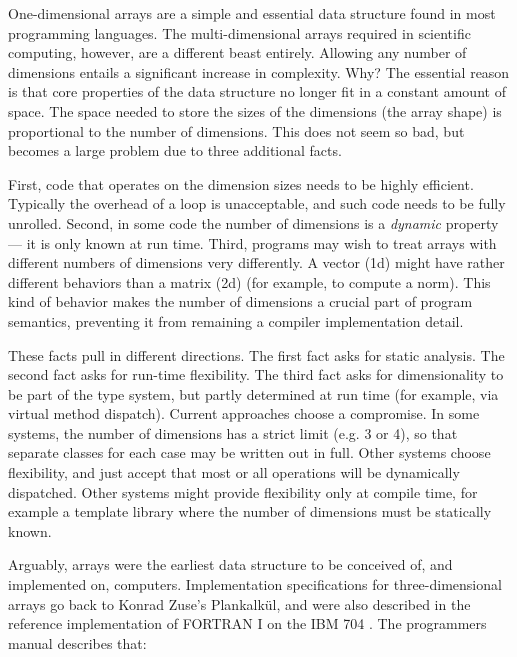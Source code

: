 \documentclass[preprint]{sigplanconf}
\begin{document}
One-dimensional arrays are a simple and essential data structure found in
most programming languages. The multi-dimensional arrays required in
scientific computing, however, are a different beast entirely. Allowing
any number of dimensions entails a significant increase in complexity. Why?
The essential reason is that core properties of the data structure no
longer fit in a constant amount of space. The space needed to store the
sizes of the dimensions (the array shape) is proportional to the number
of dimensions. This does not seem so bad, but becomes a large problem
due to three additional facts.

First, code that operates on the dimension
sizes needs to be highly efficient. Typically the overhead of a loop is
unacceptable, and such code needs to be fully unrolled. Second, in some
code the number of dimensions is a \emph{dynamic} property --- it is
only known at run time. Third, programs may wish to treat arrays with
different numbers of dimensions very differently. A vector (1d) might
have rather different behaviors than a matrix (2d) (for example, to
compute a norm). This kind of
behavior makes the number of dimensions a crucial part of program
semantics, preventing it from remaining a compiler implementation detail.


These facts pull in different directions. The first fact asks for static
analysis. The second fact asks for run-time flexibility. The third fact asks
for dimensionality to be part of the type system, but partly determined
at run time (for example, via virtual method dispatch). Current approaches
choose a compromise. In some systems, the number of dimensions has a strict
limit (e.g. 3 or 4), so that separate classes for each case may be written
out in full. Other systems choose flexibility, and just accept that most
or all operations will be dynamically dispatched. Other systems might
provide flexibility only at compile time, for example a template library
where the number of dimensions must be statically known.

Arguably, arrays were the earliest data structure to be conceived of, and implemented on, computers. Implementation specifications for three-dimensional arrays go back to Konrad Zuse's Plankalk\"ul, and were also described in the reference implementation of FORTRAN I on the IBM 704 \cite{Backus:1957fa}. The programmers manual \cite[pp.~10--11]{Backus:1956pr} describes that:
\end{document}
